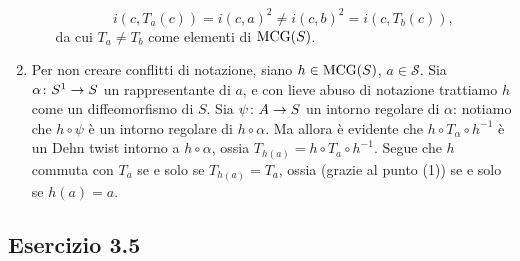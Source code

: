 \begin{enumerate}[(1)]
\begin{itemize}
\[
i(c,T_a(c))=i(c,a)^2\neq i(c,b)^2=i(c,T_b(c)),
\]
da cui $T_a\neq T_b$ come elementi di $\operatorname{MCG}(S)$.
\end{itemize}
\item Per non creare conflitti di notazione, siano $h\in\operatorname{MCG}(S)$, $a\in\mathcal{S}$. Sia $\map{\alpha}{S^1}{S}$ un rappresentante di $a$, e con lieve abuso di notazione trattiamo $h$ come un diffeomorfismo di $S$. Sia $\map{\psi}{A}{S}$ un intorno regolare di $\alpha$: notiamo che $h\circ\psi$ è un intorno regolare di $h\circ\alpha$. Ma allora è evidente che $h\circ T_\alpha\circ h^{-1}$ è un Dehn twist intorno a $h\circ\alpha$, ossia $T_{h(a)}=h\circ T_a\circ h^{-1}$. Segue che $h$ commuta con $T_a$ se e solo se $T_{h(a)}=T_a$, ossia (grazie al punto (1)) se e solo se $h(a)=a$.
\end{enumerate}

\newpage
\subsection*{Esercizio 3.5}
\newcommand{\ngon}[3][0]{
\tikzmath{
\g = #2;
\r = #3;
\n = \g * 4;
\twog = \g * 2;
}
\foreach \i [evaluate=\i as \an using 180*((2*\i-1)/\n+1)] in {1,...,\n} {
    \tkzDefPoint(\an:\r){x_\i}
    \tikzmath{\an1 = \an + #1;}
    \tkzLabelPoint[label=\an1:$x_{\i}$,anchor=base](x_\i){}
}
\begin{scope}[on background layer]
\tkzFillPolygon[blue!10](x_1,x_...,x_\n)
\end{scope}
\foreach \i in {1,...,\twog} {
    \tikzmath{
        \j = \i + 1;
        \l = \twog + \i;
        \k = \l + 1;
        if \k > \n then {
            \k = 1;
        };
        if Mod(\i, 2) == 0 then {
            let \col = white;
        } else {
            let \col = black;
        };
        \s = .15 * 3 / (\r * 5.1 * sin(180 / \n));
        \t = (\i + Mod(\i, 2) - 2) / 2;
    }
    \foreach \b/\e in {\i/\j,\k/\l} {
        \tkzDrawSegment[postaction={decorate},decoration={markings,mark=between positions (0.5+\s*0.75-\s/2*\t) and (0.51+\s*0.75+\s/2*\t) step \s with {\arrow[scale=1.2,\col]{Triangle}\arrow[scale=1.2,black]{Triangle[open]}}}](x_\b,x_\e)
    }
}
\tkzDrawPoints(x_1,x_...,x_\n)
}

